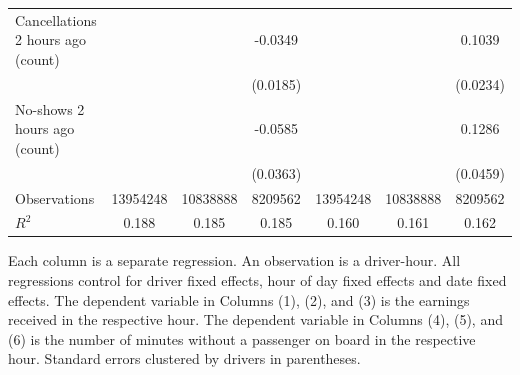 \documentclass[reviewmode]{restud}
\begin{document}
\begin{table}
{\begin{tabularx}{\textwidth}{l@{\extracolsep{\fill}}*{6}{S}}
			Cancellations 2 hours ago (count)&                     &                     &     -0.0349  &                     &                     &      0.1039\\
			                    &                     &                     &    (0.0185)         &                     &                     &    (0.0234)         \\
			\addlinespace
			No-shows 2 hours ago (count)&                     &                     &     -0.0585         &                     &                     &      0.1286\\
			                    &                     &                     &    (0.0363)         &                     &                     &    (0.0459)         \\
			\addlinespace
			Observations        &\num{13954248}         &\num{10838888}         &\num{8209562}         &\num{13954248}         &\num{10838888}         &\num{8209562}         \\
			$R^2$             &     {0.188}         &     {0.185}         &     {0.185}         &     {0.160}         &     {0.161}         &     {0.162}         \\
			\bottomrule
			\end{tabularx}
			}
			\begin{tablenotes}
				Each column is a separate regression. An observation is a driver-hour. All regressions control for driver fixed effects, hour of day fixed effects and date fixed effects. The dependent variable in Columns (1), (2), and (3) is the earnings received in the respective hour. The dependent variable in Columns (4), (5), and (6) is the number of minutes without a passenger on board in the respective hour. Standard errors clustered by drivers in parentheses.
			\end{tablenotes}
%


\end{table}
\end{document}
